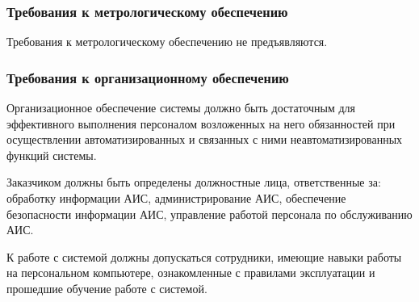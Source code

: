 \documentclass[russian, utf8, 12pt,pointsubsection,floatsubsection]{eskdtext}
\begin{document}
\subsubsection{Требования к метрологическому обеспечению}
Требования к метрологическому обеспечению не предъявляются.

\subsubsection{Требования к организационному обеспечению}
Организационное обеспечение системы должно быть достаточным для эффективного выполнения персоналом возложенных на него обязанностей при осуществлении автоматизированных и связанных с ними неавтоматизированных функций системы.

Заказчиком должны быть определены должностные лица, ответственные за: обработку информации АИС, администрирование АИС, обеспечение безопасности информации АИС, управление работой персонала по обслуживанию АИС.

К работе с системой должны допускаться сотрудники, имеющие навыки работы на персональном компьютере, ознакомленные с правилами эксплуатации и прошедшие обучение работе с системой.
\end{document}
